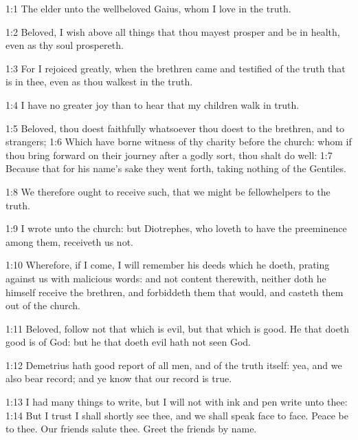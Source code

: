 

1:1 The elder unto the wellbeloved Gaius, whom I love in the truth.

1:2 Beloved, I wish above all things that thou mayest prosper and be
in health, even as thy soul prospereth.

1:3 For I rejoiced greatly, when the brethren came and testified of
the truth that is in thee, even as thou walkest in the truth.

1:4 I have no greater joy than to hear that my children walk in truth.

1:5 Beloved, thou doest faithfully whatsoever thou doest to the
brethren, and to strangers; 1:6 Which have borne witness of thy
charity before the church: whom if thou bring forward on their journey
after a godly sort, thou shalt do well: 1:7 Because that for his
name's sake they went forth, taking nothing of the Gentiles.

1:8 We therefore ought to receive such, that we might be fellowhelpers
to the truth.

1:9 I wrote unto the church: but Diotrephes, who loveth to have the
preeminence among them, receiveth us not.

1:10 Wherefore, if I come, I will remember his deeds which he doeth,
prating against us with malicious words: and not content therewith,
neither doth he himself receive the brethren, and forbiddeth them that
would, and casteth them out of the church.

1:11 Beloved, follow not that which is evil, but that which is good.
He that doeth good is of God: but he that doeth evil hath not seen
God.

1:12 Demetrius hath good report of all men, and of the truth itself:
yea, and we also bear record; and ye know that our record is true.

1:13 I had many things to write, but I will not with ink and pen write
unto thee: 1:14 But I trust I shall shortly see thee, and we shall
speak face to face. Peace be to thee. Our friends salute thee. Greet
the friends by name.

